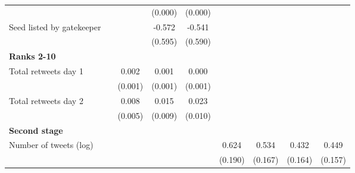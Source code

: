 {\begin{tabular}{l*{8}{c}}
                    &                     &                     &     (0.000)         &     (0.000)         &                     &                     &                     &                     \\
Seed listed by gatekeeper&                     &                     &      -0.572         &      -0.541         &                     &                     &                     &                     \\
                    &                     &                     &     (0.595)         &     (0.590)         &                     &                     &                     &                     \\
\textbf{Ranks 2-10} &                     &                     &                     &                     &                     &                     &                     &                     \\
Total retweets day 1&                     &       0.002\sym{**} &       0.001         &       0.000         &                     &                     &                     &                     \\
                    &                     &     (0.001)         &     (0.001)         &     (0.001)         &                     &                     &                     &                     \\
Total retweets day 2&                     &       0.008         &       0.015         &       0.023\sym{**} &                     &                     &                     &                     \\
                    &                     &     (0.005)         &     (0.009)         &     (0.010)         &                     &                     &                     &                     \\
\textbf{Second stage}&                     &                     &                     &                     &                     &                     &                     &                     \\
Number of tweets (log)&                     &                     &                     &                     &       0.624\sym{***}&       0.534\sym{***}&       0.432\sym{***}&       0.449\sym{***}\\
                    &                     &                     &                     &                     &     (0.190)         &     (0.167)         &     (0.164)         &     (0.157)         \\

\end{tabular}}
